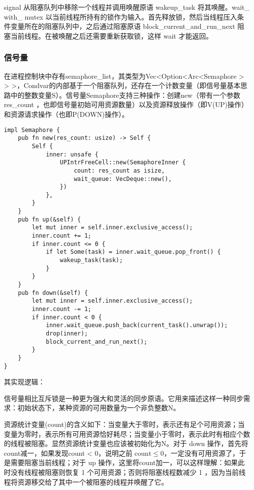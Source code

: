 signal 从阻塞队列中移除一个线程并调用唤醒原语 wakeup\_task 将其唤醒。wait\_ with\_ mutex 以当前线程所持有的锁作为输入。首先释放锁，然后当线程压入条件变量所在的阻塞队列中，之后通过阻塞原语 block\_current\_and\_run\_next 阻塞当前线程。在被唤醒之后还需要重新获取锁，这样 wait 才能返回。

\subsubsection{信号量}

在进程控制块中存有semaphore\_list，其类型为Vec<Option<Arc<Semaphore > > >，Condvar的内部基于一个阻塞队列，还存在一个计数变量（即信号量基本思路中的整数变量S）。信号量Semaphore支持三种操作：创建new（带有一个参数 res\_count ，也即信号量初始可用资源数量）以及资源释放操作（即V(UP)操作）和资源请求操作（也即P(DOWN)操作）。

\begin{lstlisting}[caption=实现相应的PV操作]
impl Semaphore {
    pub fn new(res_count: usize) -> Self {
        Self {
            inner: unsafe {
                UPIntrFreeCell::new(SemaphoreInner {
                    count: res_count as isize,
                    wait_queue: VecDeque::new(),
                })
            },
        }
    }
    pub fn up(&self) {
        let mut inner = self.inner.exclusive_access();
        inner.count += 1;
        if inner.count <= 0 {
            if let Some(task) = inner.wait_queue.pop_front() {
                wakeup_task(task);
            }
        }
    }
    pub fn down(&self) {
        let mut inner = self.inner.exclusive_access();
        inner.count -= 1;
        if inner.count < 0 {
            inner.wait_queue.push_back(current_task().unwrap());
            drop(inner);
            block_current_and_run_next();
        }
    }
}
\end{lstlisting}

其实现逻辑：

信号量相比互斥锁是一种更为强大和灵活的同步原语。它用来描述这样一种同步需求：初始状态下，某种资源的可用数量为一个非负整数$\boldsymbol{\mathrm{N}}$。

资源统计变量(count)的含义如下：当变量大于零时，表示还有足个可用资源；当变量为零时，表示所有可用资源恰好耗尽；当变量小于零时，表示此时有相应个数的线程被阻塞。显然资源统计变量也应该被初始化为$\boldsymbol{\mathrm{N}}$。对于 down 操作，首先将 count减一，如果发现count < 0，说明之前 $\mathrm{count} \le 0$，一定没有可用资源了，于是需要阻塞当前线程；对于 up 操作，这里将count加一，可以这样理解：如果此时没有线程被阻塞则恢复 1 个可用资源；否则将阻塞线程数减少 1 ，因为当前线程将资源移交给了其中一个被阻塞的线程并唤醒了它。

